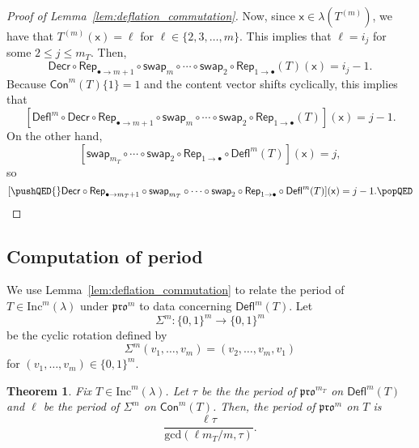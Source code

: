 \documentclass[12pt]{amsart}
\newcommand{\x}{\ensuremath{\mathsf{x}}}
\newtheorem{theorem}{Theorem}[section]
\theoremstyle{definition}
\theoremstyle{remark}
\numberwithin{equation}{section}
\newcommand{\inc}{\ensuremath{\mathrm{Inc}}}
\newcommand{\pro}{\mathfrak{pro}}
\newcommand{\swap}{\ensuremath{\mathsf{swap}}}
\newcommand{\decr}{\ensuremath{\mathsf{Decr}}}
\newcommand{\rep}{\ensuremath{\mathsf{Rep}}}
\newcommand{\deflate}{\ensuremath{\mathsf{Defl}}}
\newcommand{\content}{\ensuremath{\mathsf{Con}}}
\begin{document}
\begin{proof}[Proof of Lemma~\ref{lem:deflation_commutation}]
Now, since $\x \in \lambda(T^{(m)})$, we have that $T^{(m)}(\x) = \ell$ for $\ell \in \{2,3,\dots,m\}$. This implies that $\ell = i_j$ for some $2 \leq j \leq m_T$. Then, 
\[
\decr \circ \rep_{\bullet \to m+1} \circ \swap_m \circ \cdots \circ \swap_2 \circ \rep_{1 \rightarrow \bullet} (T)(\x) = i_j-1.
\]
Because $\content^m(T) \lbrace 1 \rbrace = 1$ and the content vector shifts cyclically, this implies that 
 \[
 [\deflate^m \circ \decr \circ \rep_{\bullet \rightarrow m+1} \circ \swap_m \circ \cdots \circ \swap_2 \circ \rep_{1 \rightarrow \bullet} (T)](\x) = j-1.
 \]
  On the other hand, 
  \[
  [\swap_{m_T} \circ \cdots \circ \swap_2 \circ \rep_{1 \rightarrow \bullet} \circ \deflate^m(T)](\x) = j,
  \]
   so 
   \[
   [ \pushQED{\qed} \decr \circ \rep_{\bullet \rightarrow m_T + 1} \circ \swap_{m_T} \circ \cdots \circ \swap_2 \circ \rep_{1 \rightarrow \bullet} \circ  \deflate^m(T)](\x) = j-1. \qedhere \popQED \] \let\qed\relax
\end{proof}

\subsection{Computation of period}\label{sec:period} We use Lemma~\ref{lem:deflation_commutation} to relate the period of $T \in \inc^m(\lambda)$ under $\pro^m$ to data concerning $\deflate^m(T)$. Let 
\[\Sigma^m : \lbrace 0,1\rbrace^m \rightarrow \lbrace 0,1\rbrace^m\]
 be the cyclic rotation defined by 
 \[
 \Sigma^m(v_1, \dots, v_m) = (v_2, \dots, v_m, v_1)
 \]
  for $(v_1, \dots, v_m) \in \lbrace 0,1 \rbrace^m$. 
  
\begin{theorem}\label{thm:periodthm}
Fix $T \in \inc^m(\lambda)$. Let $\tau$ be the the period of $\pro^{m_T}$ on $\deflate^m(T)$ and $\ell$ be the period of $\Sigma^m$ on $\content^m(T)$. Then, the period of $\pro^m$ on $T$ is \[\frac{\ell  \tau}{\mathrm{gcd}(\ell m_T / m,\tau)}. \]
\end{theorem} 
    
\end{document}
